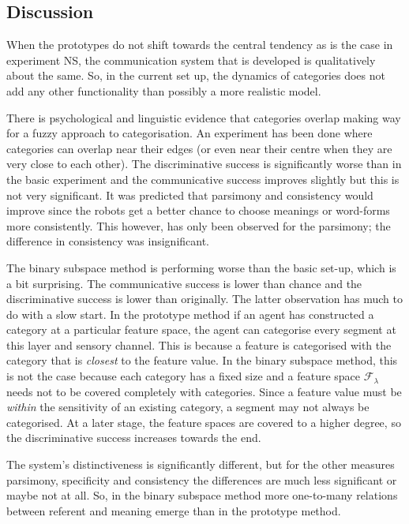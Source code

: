 \subsection{Discussion}

When the prototypes do not shift towards the central tendency as is the case in experiment NS, the communication system that is developed is qualitatively about the same. So, in the current set up, the dynamics of categories does not add any other functionality than possibly a more realistic model.


There is psychological and linguistic evidence that categories overlap making way for a fuzzy approach to categorisation. An experiment has been done where categories can overlap near their edges (or even near their centre when they are very close to each other). The discriminative success is significantly worse than in the basic experiment and the communicative success improves slightly but this is not very significant. It was predicted that parsimony and consistency would improve since the robots get a better chance to choose meanings or word-forms more consistently. This however, has only been observed for the parsimony; the difference in consistency was insignificant.


The binary subspace method is performing worse than the basic set-up, which is a bit surprising. The communicative success is lower than chance and the discriminative success is lower than originally. The latter observation has much to do with a slow start. In the prototype method if an agent has constructed a category at a particular feature space, the agent can categorise every segment at this layer and sensory channel. This is because a feature is categorised with the category that is {\em closest} to the feature value. In the binary subspace method, this is not the case because each category has a fixed size and a feature space ${\mathcal F}_\lambda$ needs not to be covered completely with categories. Since a feature value must be {\em within} the sensitivity of an existing category, a segment may not always be categorised. At a later stage, the feature spaces are covered to a higher degree, so the discriminative success increases towards the end.

The system's distinctiveness is significantly different, but for the other measures parsimony, specificity and consistency the differences are much less significant or maybe not at all. So, in the binary subspace method more one-to-many relations between referent and meaning emerge than in the prototype method.

